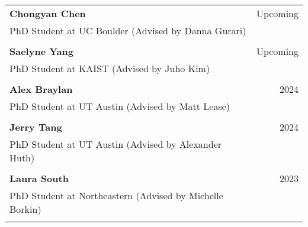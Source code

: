 \begin{longtable}{Xr}
	\textbf{Chongyan Chen} & Upcoming \\
	PhD Student at UC Boulder (Advised by Danna Gurari) &  \\
	\\

	\textbf{Saelyne Yang} & Upcoming \\
	PhD Student at KAIST (Advised by Juho Kim) &  \\
	\\

	\textbf{Alex Braylan} & 2024 \\
	PhD Student at UT Austin (Advised by Matt Lease) &  \\
	\\

	\textbf{Jerry Tang} & 2024 \\
	PhD Student at UT Austin (Advised by Alexander Huth) &  \\
	\\

	\textbf{Laura South} & 2023 \\
	PhD Student at Northeastern (Advised by Michelle Borkin) &  \\
	\\

\end{longtable}